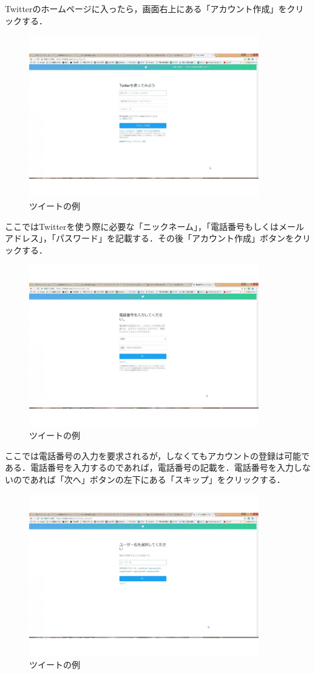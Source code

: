 Twitterのホームページに入ったら，画面右上にある「アカウント作成」をクリックする．
\begin{figure}[htb]
\centering
\includegraphics[width=10cm]{twitter15.pdf}
\caption{ツイートの例}\label{ace}
\end{figure}

\clearpage

ここではTwitterを使う際に必要な「ニックネーム」，「電話番号もしくはメールアドレス」，「パスワード」を記載する．その後「アカウント作成」ボタンをクリックする．

\begin{figure}[htb]
\centering
\includegraphics[width=10cm]{twitter20.pdf}
\caption{ツイートの例}\label{ace}
\end{figure}


ここでは電話番号の入力を要求されるが，しなくてもアカウントの登録は可能である．電話番号を入力するのであれば，電話番号の記載を．電話番号を入力しないのであれば「次へ」ボタンの左下にある「スキップ」をクリックする．

\begin{figure}[htb]
\centering
\includegraphics[width=10cm]{twitter25.pdf}
\caption{ツイートの例}\label{ace}
\end{figure}


